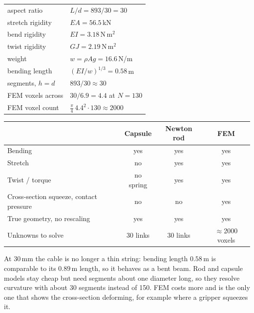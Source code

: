 \documentclass[10pt,a4paper]{article}
\begin{document}
\vspace{2pt}
{\small
\begin{minipage}[t]{0.42\linewidth}
\begin{tabular}{@{}l@{\quad}l@{}}
aspect ratio & $L/d = 893/30 = 30$ \\
stretch rigidity & $EA = 56.5$\,kN \\
bend rigidity & $EI = 3.18$\,N\,m$^2$ \\
twist rigidity & $GJ = 2.19$\,N\,m$^2$ \\
weight & $w = \rho A g = 16.6$\,N/m \\
bending length & $(EI/w)^{1/3} = 0.58$\,m \\
segments, $h=d$ & $893/30 \approx 30$ \\
FEM voxels across & $30/6.9 = 4.4$ at $N=130$ \\
FEM voxel count & $\tfrac{\pi}{4}\,4.4^2\cdot130 \approx 2000$ \\
\end{tabular}
\end{minipage}\hfill
\begin{minipage}[t]{0.57\linewidth}
\renewcommand{\arraystretch}{1.15}
\begin{tabular}{@{}L{2.5cm} c c c@{}}
\toprule
 & \textbf{Capsule} & \textbf{Newton rod} & \textbf{FEM} \\
\midrule
Bending & yes & yes & yes \\
Stretch & no & yes & yes \\
Twist / torque & no spring & yes & yes \\
Cross-section squeeze, contact pressure & no & no & yes \\
True geometry, no rescaling & yes & yes & yes \\
Unknowns to solve & 30 links & 30 links & $\approx$2000 voxels \\
\bottomrule
\end{tabular}
\end{minipage}}

\vspace{4pt}
{\small At 30\,mm the cable is no longer a thin string: bending length $0.58$\,m is
comparable to its $0.89$\,m length, so it behaves as a bent beam. Rod and capsule
models stay cheap but need segments about one diameter long, so they resolve
curvature with about 30 segments instead of 150. FEM costs more and is the only one that
shows the cross-section deforming, for example where a gripper squeezes it.}

\vspace{5pt}
\end{document}
